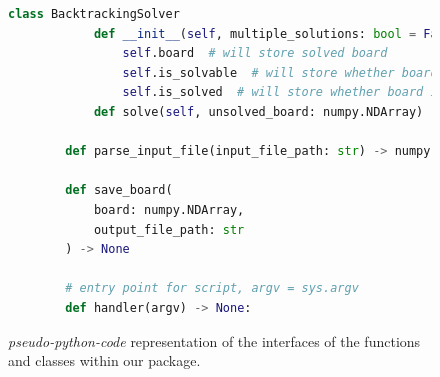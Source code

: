     \begin{figure}[htb]
    \centering
    \begin{lstlisting}[language=Python,label={lst:lstlisting}]
        class BacktrackingSolver
            def __init__(self, multiple_solutions: bool = False):
                self.board  # will store solved board
                self.is_solvable  # will store whether board is solvable
                self.is_solved  # will store whether board is solved
            def solve(self, unsolved_board: numpy.NDArray) -> None:

        def parse_input_file(input_file_path: str) -> numpy.NDArray

        def save_board(
            board: numpy.NDArray,
            output_file_path: str
        ) -> None

        # entry point for script, argv = sys.argv
        def handler(argv) -> None:
    \end{lstlisting}
    \caption{\textit{pseudo-python-code} representation of the interfaces of the functions and classes within our
     package.}
    \label{fig:pseudocode}
    \end{figure}
